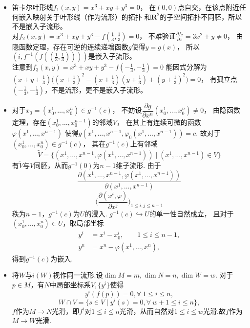 \begin{itemize}
    \item[22.]
    笛卡尔叶形线$f_1(x,y)=x^3+xy+y^3=0$，
    在$(0,0)$点自交，在该点附近任何嵌入映射关于叶形线（作为流形）的拓扑
    和$\mathbf{R}^2$的子空间拓扑不同胚，所以不是嵌入子流形。
    \\
    对$f_2(x,y)=x^3+xy+y^3-f(\frac{1}{3},\frac{1}{3})=0$，
    不难验证$\frac{\partial f_2}{\partial x}=3x^2+y\neq0$，
    由隐函数定理，存在可逆的连续递增函数$g$使得$y=g(x)$，
    所以$(i,f^{-1}(f((\frac{1}{3},\frac{1}{3}))))$是嵌入子流形。
    \\
    注意到$f_3(x,y)=x^3+xy+y^3-f(-\frac{1}{3},-\frac{1}{3})=0$
    能因式分解为$(x+y+\frac{1}{3})\big((x+\frac{1}{3})^2
    -(x+\frac{1}{3})(y+\frac{1}{3})+(y+\frac{1}{3})^2\big)=0$，
    有孤立点$(-\frac{1}{3},-\frac{1}{3})$，不是流形，更不是嵌入子流形。

    \item[23.]
    对于$x_{0}=(x_{0}^{1},\ldots,x_{0}^{n}) \in g^{-1}(c)$，
    不妨设$\dfrac{\partial g}{\partial x^{n}}(x_{0}^{1},\ldots,x_{0}^{n}) \ne 0$，
    由隐函数定理，存在$(x_{0}^{1},\ldots,x_{0}^{n-1})$的邻域$V$，
    在其上有连续可微的函数$\varphi(x^{1},\ldots,x^{n-1})$
    使得$g(x^{1},\ldots,x^{n-1},\varphi_{0}(x^{1},\ldots,x^{n-1}))=c$.
    故对于$(x_{0}^{1},\ldots,x_{0}^{n}) \in g^{-1}(c)$，
    其在$g^{-1}(c)$上有邻域
    $$\tilde{V}=\{(x^{1},\ldots,x^{n-1},\varphi(x^{1},\ldots,x^{n-1})) 
    \mid (x^{1},\ldots,x^{n-1}) \in V\}$$
    有$\tilde{V}$与$V$同胚，从而$g^{-1}(0)$为$n-1$维子流形.
    由于$$
    \dfrac{\partial (x^{1},\ldots,x^{n-1},\varphi(x^{1},\ldots,x^{n-1}))}{\partial (x^{1},\ldots,x^{n-1})}
    $$
    \[
        \Big(\frac{\partial(x^i,\varphi)}{\partial x^j}\Big)_{1\leq i,j\leq n-1}
    \]
    秩为$n-1$，$g^{-1}(c)$为$U$的浸入.
    $g^{-1}(c) \hookrightarrow U$的单一性自然成立，
    且对于$(x_{0}^{1},\ldots,x_{0}^{n}) \in U$，取局部坐标
    \begin{align*}
        y^{i}&=  x^{i}-x_{0}^{i}, \qquad 1 \leq i \leq n-1, \\
        y^{n}&=  x^{n}-\varphi(x^{1},\ldots,x^{n}),   
    \end{align*}
    得到$g^{-1}(c)$为嵌入.
    
    \item[24.]
    将$W$与$i(W)$视作同一流形.设$\dim M=m, \dim N=n, \dim W=w$.
    对于$p\in M$，有$N$中局部坐标系$V,\{y^{i}\}$使得
    $$y^{i}(f(p))=0, \forall\ 1 \leq i \leq n,$$
    $$W\cap V = \{s\in V\mid y^{i}(s)=0,\forall\ w+1\leq i \leq n\},$$
    $f$作为$M\to N$光滑，即$f^{i}$对$1\leq i \leq n$光滑，从而自然对$1 \leq i \leq w$光滑.故$f$作为$M\to W$光滑.


\end{itemize}
